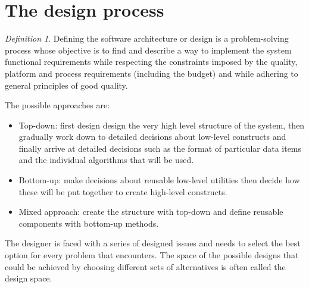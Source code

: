 \documentclass[12pt, a4paper]{report}
\theoremstyle{remark}
\newtheorem*{remark}{Definition}
\begin{document}
\section{The design process}
    \begin{remark}
        Defining the software architecture or design is a problem-solving process whose objective is to find and describe a way to implement the system functional requirements while respecting the constraints imposed by the quality, platform and process requirements (including the budget) and while adhering to general principles of good quality.
    \end{remark}
    The possible approaches are: 
    \begin{itemize}
        \item Top-down: first design design the very high level structure of the system, then gradually work down to detailed decisions about low-level constructs and finally arrive at detailed decisions such as the format of particular data items and the individual algorithms that will be used.
        \item Bottom-up: make decisions about reusable low-level utilities then decide how these will be put together to create high-level constructs.
        \item Mixed approach: create the structure with top-down and define reusable components with bottom-up methods.
    \end{itemize}
    The designer is faced with a series of designed issues and needs to select the best option for every problem that encounters. The space of the possible designs that could be achieved by choosing different sets of alternatives is often called the design space. 
    










    

    
\end{document}
